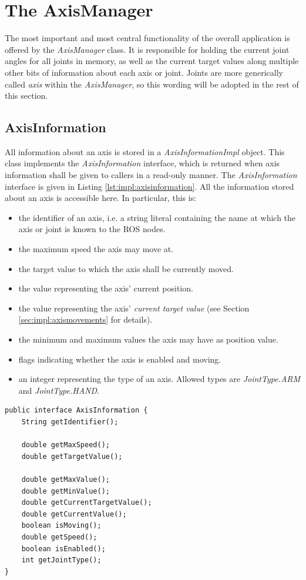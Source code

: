 \section{The AxisManager}

The most important and most central functionality of the overall application is offered by the \textit{AxisManager} class. It is responsible for holding the current joint angles for all joints in memory, as well as the current target values along multiple other bits of information about each axis or joint. Joints are more generically called \textit{axis} within the \textit{AxisManager}, so this wording will be adopted in the rest of this section.

\subsection{AxisInformation}

All information about an axis is stored in a \textit{AxisInformationImpl} object. This class implements the \textit{AxisInformation} interface, which is returned when axis information shall be given to callers in a read-only manner. The \textit{AxisInformation} interface is given in Listing \ref{lst:impl:axisinformation}. All the information stored about an axis is accessible here. In particular, this is: 
\begin{itemize}
	\item the identifier of an axis, i.e. a string literal containing the name at which the axis or joint is known to the ROS nodes.
	\item the maximum speed the axis may move at.
	\item the target value to which the axis shall be currently moved.
	\item the value representing the axis' current position.
	\item the value representing the axis' \textit{current target value} (see Section \ref{sec:impl:axismovements} for details).
	\item the minimum and maximum values the axis may have as position value.
	\item flags indicating whether the axis is enabled and moving.
	\item an integer representing the type of an axis. Allowed types are \textit{JointType.ARM} and \textit{JointType.HAND}.
\end{itemize}

\begin{lstlisting}[caption={The AxisInformation interface}, label=lst:impl:axisinformation]
public interface AxisInformation {
	String getIdentifier();
	
	double getMaxSpeed();
	double getTargetValue();
	
	double getMaxValue();
	double getMinValue();
	double getCurrentTargetValue();
	double getCurrentValue();
	boolean isMoving();
	double getSpeed();
	boolean isEnabled();
	int getJointType();
}
\end{lstlisting}

